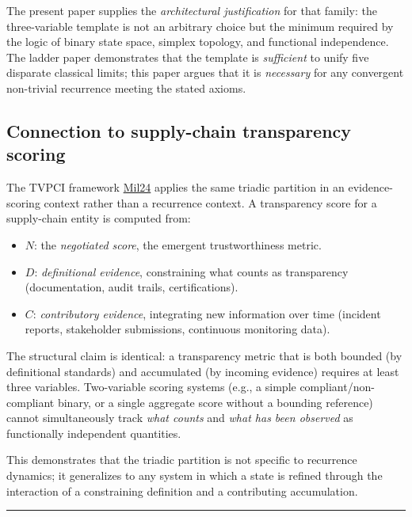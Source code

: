 \documentclass[12pt]{article}
\providecommand{\tightlist}{%
  \setlength{\itemsep}{0pt}\setlength{\parskip}{0pt}}
\begin{document}
The present paper supplies the \emph{architectural justification} for
that family: the three-variable template is not an arbitrary choice but
the minimum required by the logic of binary state space, simplex
topology, and functional independence. The ladder paper demonstrates
that the template is \emph{sufficient} to unify five disparate classical
limits; this paper argues that it is \emph{necessary} for any convergent
non-trivial recurrence meeting the stated axioms.

\subsection{Connection to supply-chain transparency scoring}\label{connection-to-supply-chain-transparency-scoring}

The TVPCI framework \href{https://tholonia.github.io/the-book/}{Mil24}
applies the same triadic partition in an evidence-scoring context rather
than a recurrence context. A transparency score for a supply-chain
entity is computed from:

\begin{itemize}
\tightlist
\item
  \(N\): the \emph{negotiated score}, the emergent trustworthiness
  metric.
\item
  \(D\): \emph{definitional evidence}, constraining what counts as
  transparency (documentation, audit trails, certifications).
\item
  \(C\): \emph{contributory evidence}, integrating new information over
  time (incident reports, stakeholder submissions, continuous monitoring
  data).
\end{itemize}

The structural claim is identical: a transparency metric that is both
bounded (by definitional standards) and accumulated (by incoming
evidence) requires at least three variables. Two-variable scoring
systems (e.g., a simple compliant/non-compliant binary, or a single
aggregate score without a bounding reference) cannot simultaneously
track \emph{what counts} and \emph{what has been observed} as
functionally independent quantities.

This demonstrates that the triadic partition is not specific to
recurrence dynamics; it generalizes to any system in which a state is
refined through the interaction of a constraining definition and a
contributing accumulation.

\begin{center}\rule{0.5\linewidth}{0.5pt}\end{center}
\end{document}
